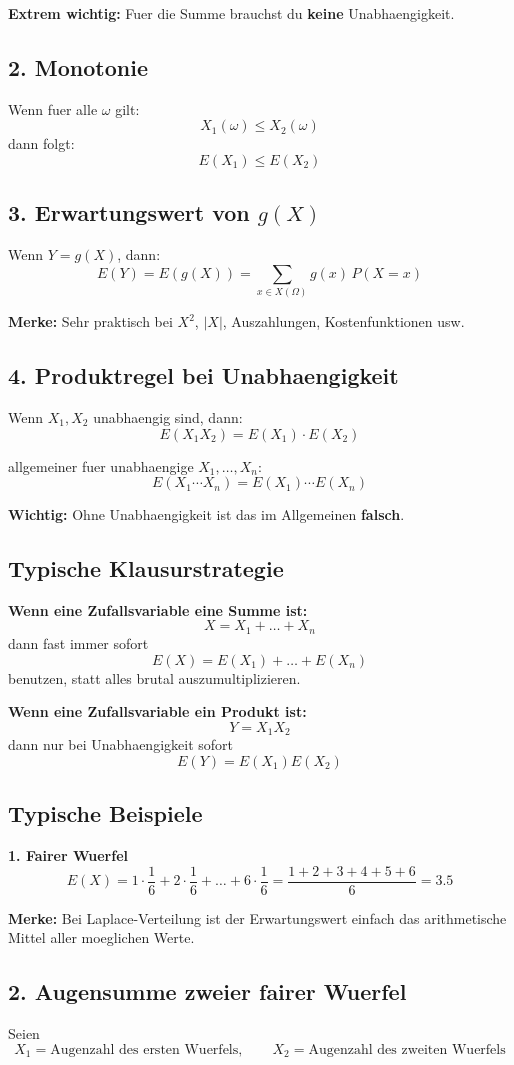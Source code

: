 \documentclass[a4paper,11pt]{article}
\begin{document}
\textbf{Extrem wichtig:}
Fuer die Summe brauchst du \textbf{keine} Unabhaengigkeit.

\subsection{2. Monotonie}
Wenn fuer alle $\omega$ gilt:
\[
X_1(\omega)\le X_2(\omega)
\]
dann folgt:
\[
E(X_1)\le E(X_2)
\]

\subsection{3. Erwartungswert von $g(X)$}
Wenn $Y=g(X)$, dann:
\[
E(Y)=E(g(X))=\sum_{x \in X(\Omega)} g(x)\,P(X=x)
\]

\textbf{Merke:}
Sehr praktisch bei $X^2$, $|X|$, Auszahlungen, Kostenfunktionen usw.

\subsection{4. Produktregel bei Unabhaengigkeit}
Wenn $X_1,X_2$ unabhaengig sind, dann:
\[
E(X_1X_2)=E(X_1)\cdot E(X_2)
\]

allgemeiner fuer unabhaengige $X_1,\dots,X_n$:
\[
E(X_1\cdots X_n)=E(X_1)\cdots E(X_n)
\]

\textbf{Wichtig:}
Ohne Unabhaengigkeit ist das im Allgemeinen \textbf{falsch}.

\subsection{Typische Klausurstrategie}
\textbf{Wenn eine Zufallsvariable eine Summe ist:}
\[
X=X_1+\dots+X_n
\]
dann fast immer sofort
\[
E(X)=E(X_1)+\dots+E(X_n)
\]
benutzen, statt alles brutal auszumultiplizieren.

\textbf{Wenn eine Zufallsvariable ein Produkt ist:}
\[
Y=X_1X_2
\]
dann nur bei Unabhaengigkeit sofort
\[
E(Y)=E(X_1)E(X_2)
\]

\subsection{Typische Beispiele}
\textbf{1. Fairer Wuerfel}
\[
E(X)=1\cdot \frac16+2\cdot \frac16+\dots+6\cdot \frac16=\frac{1+2+3+4+5+6}{6}=3.5
\]

\textbf{Merke:}
Bei Laplace-Verteilung ist der Erwartungswert einfach das arithmetische Mittel aller moeglichen Werte.

\subsection{2. Augensumme zweier fairer Wuerfel}
Seien
\[
X_1=\text{Augenzahl des ersten Wuerfels},\qquad X_2=\text{Augenzahl des zweiten Wuerfels}
\]
\end{document}
